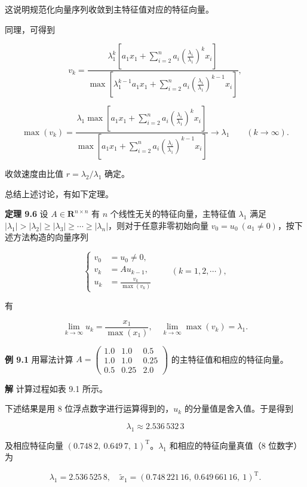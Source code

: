 \documentclass[
  10pt,
  fontset=fandol]{ctexart}
\begin{document}
这说明规范化向量序列收敛到主特征值对应的特征向量。

同理，可得到

\[
v_k=\frac{\lambda_1^k\left[a_1x_1+\displaystyle\sum_{i=2}^na_i\left(\frac{\lambda_i}{\lambda_1}\right)^kx_i\right]}{\max\left[\lambda_1^{k-1}a_1x_1+\displaystyle\sum_{i=2}^na_i\left(\frac{\lambda_i}{\lambda_1}\right)^{k-1}x_i\right]},
\]

\[
\max(v_k)=\frac{\lambda_1\max\left[a_1x_1+\displaystyle\sum_{i=2}^na_i\left(\frac{\lambda_i}{\lambda_1}\right)^kx_i\right]}{\max\left[a_1x_1+\displaystyle\sum_{i=2}^na_i\left(\frac{\lambda_i}{\lambda_1}\right)^{k-1}x_i\right]}\to\lambda_1\qquad(k\to\infty).
\]

收敛速度由比值 \(r=\lambda_2/\lambda_1\) 确定。

总结上述讨论，有如下定理。

\textbf{定理 9.6} 设 \(A\in\mathbf R^{n\times n}\) 有 \(n\) 个线性无关的特征向量，主特征值 \(\lambda_1\) 满足 \(|\lambda_1|>|\lambda_2|\geq|\lambda_3|\geq\cdots\geq|\lambda_n|\)，则对于任意非零初始向量 \(v_0=u_0\ (a_1\ne0)\)，按下述方法构造的向量序列

\[
\left\{
\begin{aligned}
v_0&=u_0\ne0,\\
v_k&=Au_{k-1},\\
u_k&=\frac{v_k}{\max(v_k)}
\end{aligned}
\right.\qquad(k=1,2,\cdots),
\tag{9.2.9}
\]

有

\[
\lim_{k\to\infty}u_k=\frac{x_1}{\max(x_1)},\quad\lim_{k\to\infty}\max(v_k)=\lambda_1.
\]

\textbf{例 9.1} 用幂法计算 \(A=\begin{pmatrix}1.0&1.0&0.5\\1.0&1.0&0.25\\0.5&0.25&2.0\end{pmatrix}\) 的主特征值和相应的特征向量。

\textbf{解} 计算过程如表 9.1 所示。

下述结果是用 8 位浮点数字进行运算得到的，\(u_k\) 的分量值是舍入值。于是得到

\[
\lambda_1\approx2.536\,532\,3
\]

及相应特征向量 \((0.748\,2,\ 0.649\,7,\ 1)^{\mathrm T}\)。\(\lambda_1\) 和相应的特征向量真值（8 位数字）为

\[
\lambda_1=2.536\,525\,8,\quad\widetilde{x}_1=(0.748\,221\,16,\ 0.649\,661\,16,\ 1)^{\mathrm T}.
\]
\end{document}
